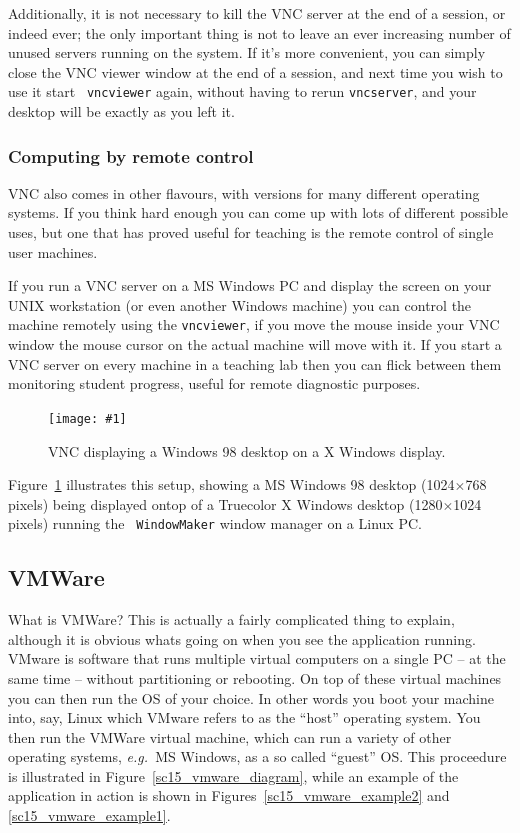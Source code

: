 \documentclass[twoside,11pt]{article}
\newcommand{\htmladdnormallink}[2]{#1}
\newcommand{\htmladdimg}[1]{}
\newcommand{\xlabel}[1]{}
\newcommand{\myfig}[5]{
  \begin{figure}
    \centering\texttt{[image: \#1]}
    \typeout{#1 inserted on page \arabic{page}}
    \caption{\label{#4}#5}
  \end{figure}
  }
\newcommand{\myfig}[5]{
    \label{#4} \htmladdimg{#3}\\
    Figure: #5\\
  }
\begin{document}
Additionally, it is not necessary to kill the VNC server at the end of
a session, or indeed ever; the only important thing is not to leave an
ever increasing number of unused servers running on the system. If
it's more convenient, you can simply close the VNC viewer window at
the end of a session, and next time you wish to use it start {\tt
vncviewer} again, without having to rerun {\tt vncserver}, and your
desktop will be exactly as you left it.

\subsubsection{Computing by remote control}

\htmladdnormallink{VNC}{http://www.uk.research.att.com/vnc/} also
comes in other flavours, with versions for many different operating
systems. If you think hard enough you can come up with lots of
different possible uses, but one that has proved useful for teaching
is the remote control of single user machines.

If you run a VNC server on a MS Windows PC and display the screen on
your UNIX workstation (or even another Windows machine) you can
control the machine remotely using the {\tt vncviewer}, if you move
the mouse inside your VNC window the mouse cursor on the actual
machine will move with it. If you start a VNC server on every machine
in a teaching lab then you can flick between them monitoring student
progress, useful for remote diagnostic purposes.

\myfig{sc15_vncwin.eps}{height=0.45\textheight}{sc15_vncwin.gif}{sc15_vnc_win}{VNC
displaying a Windows 98 desktop on a X Windows display.}

Figure~\ref{sc15_vnc_win} illustrates this setup, showing a MS Windows
98 desktop (1024$\times$768 pixels) being displayed ontop of a
Truecolor X Windows desktop (1280$\times$1024 pixels) running the {\tt
WindowMaker} window manager on a Linux PC.

\subsection{\xlabel{sc15_vmware}VMWare\label{sc15_vmware}}

What is \htmladdnormallink{VMWare}{http://www.vmware.com/}? This is
actually a fairly complicated thing to explain, although it is obvious
whats going on when you see the application running. VMware is
software that runs multiple virtual computers on a single PC -- at the
same time -- without partitioning or rebooting. On top of these
virtual machines you can then run the OS of your choice. In other
words you boot your machine into, say, Linux which VMware refers to as
the ``host'' operating system. You then run the VMWare virtual
machine, which can run a variety of other operating systems, {\em
e.g.\ }MS Windows, as a so called ``guest'' OS. This proceedure is
illustrated in Figure~\ref{sc15_vmware_diagram}, while an example of
the application in action is shown in
Figures~\ref{sc15_vmware_example2} and \ref{sc15_vmware_example1}.
\end{document}
